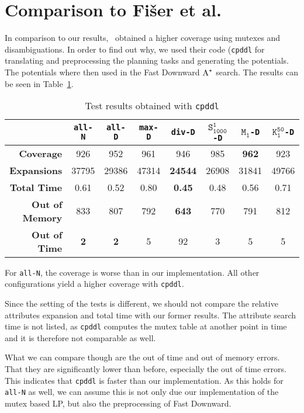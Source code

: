 \section{Comparison to Fi{\v{s}}er et al.}\label{sec:comparison-to-fiser}
In comparison to our results,~\citeauthor{fivser2020strengthening} obtained a higher coverage using mutexes and disambiguations.
In order to find out why, we used their code (\texttt{cpddl} for translating and preprocessing the planning tasks and generating the potentials.
The potentials where then used in the Fast Downward $\textup{A}^\star$ search.
The results can be seen in Table~\ref{table:fiser}.

\begin{table}[h!]
    \begin{center}
        \begin{tabular}{|r|c|c|c|c|c|c|c|}
            \hline
            & \textbf{\texttt{all-N}} & \textbf{\texttt{all-D}} & \textbf{\texttt{max-D}} & \textbf{\texttt{div-D}} & \textbf{$\texttt{S}_\texttt{1000}^\texttt{1}$\texttt{-D}} & \textbf{$\texttt{M}_\texttt{1}$\texttt{-D}} & \textbf{$\texttt{K}_\texttt{1}^\texttt{50}$\texttt{-D}} \\
            \hline \hline
            \textbf{Coverage}       & 926       & 952       & 961   & 946           & 985   & \textbf{962}  & 923   \\ \hline
            \textbf{Expansions}     & 37795     & 29386     & 47314 & \textbf{24544}& 26908 & 31841         & 49766 \\ \hline
            \textbf{Total Time}     & 0.61      & 0.52      & 0.80  & \textbf{0.45} & 0.48  & 0.56          & 0.71  \\ \hline
            \textbf{Out of Memory}  & 833       & 807       & 792   & \textbf{643}  & 770   & 791           & 812   \\ \hline
            \textbf{Out of Time}    & \textbf{2}& \textbf{2}& 5     & 92            & 3     & 5             & 5     \\ \hline
        \end{tabular}
        \caption{Test results obtained with \texttt{cpddl}}
        \label{table:fiser}
    \end{center}
\end{table}

For \texttt{all-N}, the coverage is worse than in our implementation.
All other configurations yield a higher coverage with \texttt{cpddl}.

Since the setting of the tests is different, we should not compare the relative attributes expansion and total time with our former results.
The attribute search time is not listed, as \texttt{cpddl} computes the mutex table at another point in time and it is therefore not comparable as well.

What we can compare though are the out of time and out of memory errors.
That they are significantly lower than before, especially the out of time errors.
This indicates that \texttt{cpddl} is faster than our implementation.
As this holds for \texttt{all-N} as well, we can assume this is not only due our implementation of the mutex based LP, but also the preprocessing of Fast Downward.
